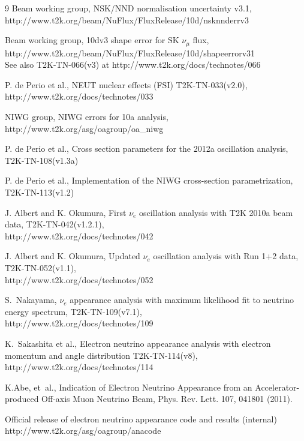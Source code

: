 \begin{thebibliography}{9}
  Beam working group,
  NSK/NND normalisation uncertainty v3.1, \\
  http://www.t2k.org/beam/NuFlux/FluxRelease/10d/nsknnderrv3

  Beam working group,
  10dv3 shape error for SK $\nu_{\mu}$ flux, \\
  http://www.t2k.org/beam/NuFlux/FluxRelease/10d/shapeerrorv31 \\
  See also T2K-TN-066(v3) at http://www.t2k.org/docs/technotes/066

  P. de Perio et al.,
  NEUT nuclear effects (FSI)
  T2K-TN-033(v2.0),
  http://www.t2k.org/docs/technotes/033

  NIWG group,
  NIWG errors for 10a analysis, \\
  http://www.t2k.org/asg/oagroup/oa\_niwg

  P. de Perio et al.,
  Cross section parameters for the 2012a oscillation analysis,
  T2K-TN-108(v1.3a)

  P. de Perio et al.,
  Implementation of the NIWG cross-section parametrization,
  T2K-TN-113(v1.2)

  J. Albert and K. Okumura,
  First $\nu_{e}$ oscillation analysis with T2K 2010a beam data,
  T2K-TN-042(v1.2.1),\\
  http://www.t2k.org/docs/technotes/042

  J. Albert and K. Okumura,
  Updated $\nu_{e}$ oscillation analysis with Run 1+2 data,
  T2K-TN-052(v1.1),\\
  http://www.t2k.org/docs/technotes/052

  S.\ Nakayama,
  $\nu_{e}$ appearance analysis with maximum likelihood fit to neutrino energy spectrum,
  T2K-TN-109(v7.1),\\
  http://www.t2k.org/docs/technotes/109

  K.\ Sakashita et al.,
  Electron neutrino appearance analysis with electron momentum and angle distribution
  T2K-TN-114(v8),\\
  http://www.t2k.org/docs/technotes/114

  K.Abe, et~al., Indication of Electron Neutrino Appearance from an Accelerator-produced Off-axis Muon Neutrino Beam, 
  Phys. Rev. Lett. 107, 041801 (2011). 

  Official release of electron neutrino appearance code and results (internal)
  http://www.t2k.org/asg/oagroup/anacode


\end{thebibliography}
